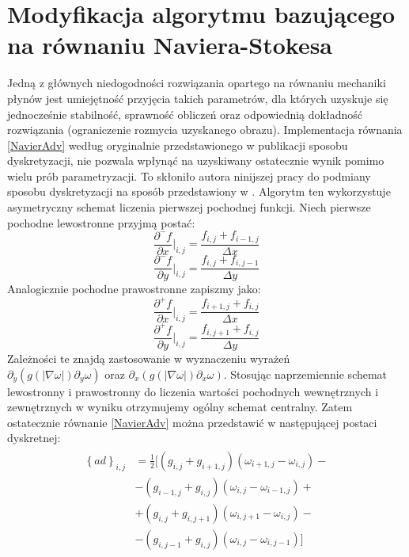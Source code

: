 \documentclass[12pt, twoside, openany]{report}
\theoremstyle{definition}
\begin{document}
\section{Modyfikacja algorytmu bazującego na równaniu Naviera-Stokesa}
Jedną z głównych niedogodności rozwiązania opartego na równaniu mechaniki płynów jest umiejętność przyjęcia takich parametrów, dla których uzyskuje się jednocześnie stabilność, sprawność obliczeń oraz odpowiednią dokładność rozwiązania (ograniczenie rozmycia uzyskanego obrazu). Implementacja równania \eqref{NavierAdv} według oryginalnie przedstawionego w publikacji \cite{au2001image} sposobu dyskretyzacji, nie pozwala wpłynąć na uzyskiwany ostatecznie wynik pomimo wielu prób parametryzacji. To skłoniło autora ninijszej pracy do podmiany sposobu dyskretyzacji na sposób przedstawiony w \cite{van2005algorithms}. Algorytm ten wykorzystuje asymetryczny schemat liczenia pierwszej pochodnej funkcji. Niech pierwsze pochodne lewostronne przyjmą postać:
\begin{equation}
\frac{\partial^-f}{\partial x}\bigg|_{i,j}=\frac{f_{i,j}+f_{i-1,j}}{\Delta x}
\label{leftdfdx}
\end{equation}
\begin{equation}
{\frac{{\partial }^-f}{\partial y}}\bigg|_{i,j}=\frac{f_{i,j}+f_{i,j-1}}{\Delta y}
\label{leftdfdy}
\end{equation}
Analogicznie pochodne prawostronne zapiszmy jako:
\begin{equation}
{\frac{{\partial }^+f}{\partial x}}\bigg|_{i,j}=\frac{f_{i+1,j}+f_{i,j}}{\Delta x} 
\label{rightdfdx}
\end{equation}
\begin{equation}
{\frac{{\partial }^+f}{\partial y}}\bigg|_{i,j}=\frac{f_{i,j+1}+f_{i,j}}{\Delta y}
\label{rightdfdy}
\end{equation}
Zależności te znajdą zastosowanie w wyznaczeniu wyrażeń \\
${\partial }_y\left(g\left(\left|\nabla \omega \right|\right){\partial }_y\omega \right)$ oraz
${\partial }_x\left(g\left(\left|\nabla \omega \right|\right){\partial }_x\omega \right)$. Stosując naprzemiennie schemat lewostronny i prawostronny do liczenia wartości pochodnych wewnętrznych i zewnętrznych w wyniku otrzymujemy ogólny schemat centralny. Zatem ostatecznie równanie \eqref{NavierAdv} można przedstawić w następującej postaci dyskretnej:
\begin{align}
\begin{aligned}
{\left\{ad\right\}}_{i,j}
&= \frac{1}{2}\biggl[\left(g_{i,j}+g_{i+1,j}\right)\left({\omega }_{i+1,j}-{\omega }_{i,j}\right) -\\[1ex]
&- \left(g_{i-1,j}+g_{i,j}\right)\left({\omega }_{i,j}-{\omega }_{i-1,j}\right) +  \\[1ex]
&+ \left(g_{i,j}+g_{i,j+1}\right)\left({\omega }_{i,j+1}-{\omega }_{i,j}\right) -\\[1ex]
&- \left(g_{i,j-1}+g_{i,j}\right)\left({\omega }_{i,j}-{\omega }_{i,j-1}\right)\biggl]
\end{aligned}
\label{discreteAnisotropic2}
\end{align}
\end{document}
